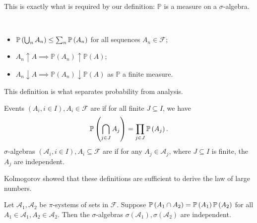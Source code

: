 This is exactly what is required by our definition: $\mathbb P$ is a measure on a $\sigma$-algebra.

\begin{remark} \
	\begin{itemize}
		\item $\mathbb{P}\left({\bigcup_n A_n}\right) \leq \sum_n \mathbb{P}\left({A_n}\right)$ for all sequences $A_n \in \mathcal{F}$;
		\item $A_n \uparrow A \implies \mathbb{P}(A_n) \uparrow \mathbb{P}(A)$;
		\item $A_n \downarrow A \implies \mathbb{P}(A_n) \downarrow \mathbb{P}(A)$ as $\mathbb{P}$ a finite measure.
	\end{itemize}
\end{remark}

This definition is what separates probability from analysis.
\begin{definition}[Independent]
	Events $(A_i, i \in I), A_i \in \mathcal{F}$ are  if for all finite $J \subseteq I$, we have
	\begin{align*}
		\mathbb{P}\left({\bigcap_{j \in J} A_j}\right) = \prod_{j \in J} \mathbb{P}\left({A_j}\right).
	\end{align*}
	$\sigma$-algebras $(\mathcal{A}_i, i \in I), A_i \subseteq \mathcal{F}$ are  if for any $A_j \in \mathcal A_j$, where $J \subseteq I$ is finite, the $A_j$ are independent.
\end{definition}

Kolmogorov showed that these definitions are sufficient to derive the law of large numbers.

\begin{proposition}
	Let $\mathcal A_1, \mathcal A_2$ be $\pi$-systems of sets in $\mathcal F$.
	Suppose $\mathbb{P}\left({A_1 \cap A_2}\right) = \mathbb{P}\left({A_1}\right) \mathbb{P}\left({A_2}\right)$ for all $A_1 \in \mathcal A_1, A_2 \in \mathcal A_2$.
	Then the $\sigma$-algebras $\sigma(\mathcal A_1), \sigma(\mathcal A_2)$ are independent.
\end{proposition}

